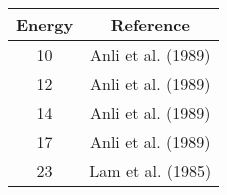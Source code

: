 \centering
\begin{tabular}{|c||c|} 
    \hline 
    \bf{Energy} & \bf{Reference} \\
    \hline
    \hline 
    10 & Anli et al. (1989) \cite{Anli1989}\\
    12 & Anli et al. (1989) \cite{Anli1989}\\
    14 & Anli et al. (1989) \cite{Anli1989}\\
    17 & Anli et al. (1989) \cite{Anli1989}\\
    23 & Lam et al. (1985) \cite{Lam1985}\\
    \hline
\end{tabular}
